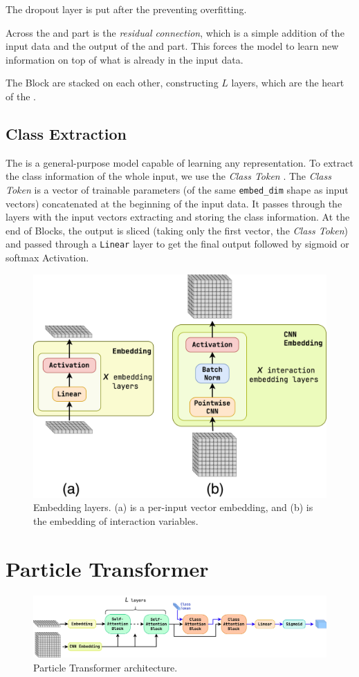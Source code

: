 The dropout layer is put after the \MHSA preventing overfitting.

Across the \MHSA and \FFN part is the \emph{residual connection}, which is a simple addition of the input data and the output of the \MHSA and \FFN part.
This forces the model to learn new information on top of what is already in the input data.

The \SA Block are stacked on each other, constructing $L$ layers, which are the heart of the \trans.

\subsection{Class Extraction}
\label{sec:class_extract}
The \trans is a general-purpose model capable of learning any representation.
To extract the class information of the whole input, we use the \emph{Class Token} \cite{bert}.
The \emph{Class Token} is a vector of trainable parameters (of the same \texttt{embed\_dim} shape as input vectors) concatenated at the beginning of the input data.
It passes through the \trans layers with the input vectors extracting and storing the class information.
At the end of \SA Blocks, the output is sliced (taking only the first vector, the \emph{Class Token}) and passed through a \texttt{Linear} layer to get the final output followed by sigmoid or softmax Activation.

\begin{figure}[htb]
    \centering
    \includegraphics[width=0.7\linewidth]{src/diagrams/embedding.png}
    \caption{Embedding layers. (a) is a per-input vector embedding, and (b) is the embedding of interaction variables.}
    \label{fig:embed}
\end{figure}
\section{Particle Transformer}
\label{sec:part}
\begin{figure}[htb]
    \centering
    \includegraphics[width=0.9\linewidth]{src/diagrams/part.png}
    \caption{Particle Transformer architecture.}
    \label{fig:part}
\end{figure}

